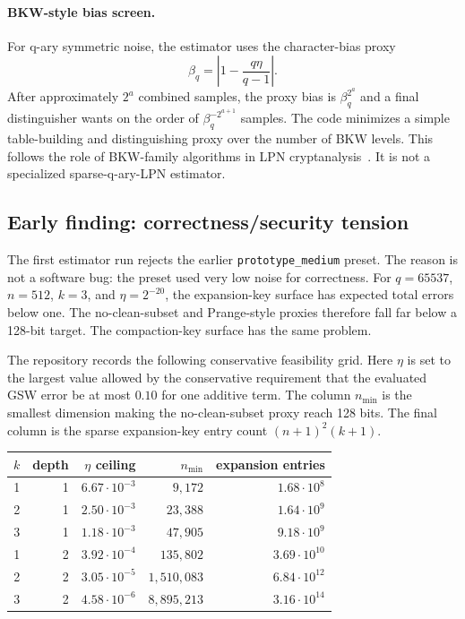 \paragraph{BKW-style bias screen.}
For q-ary symmetric noise, the estimator uses the character-bias proxy
\[
  \beta_q = \left|1-\frac{q\eta}{q-1}\right|.
\]
After approximately $2^a$ combined samples, the proxy bias is $\beta_q^{2^a}$ and a final distinguisher wants on the order of $\beta_q^{-2^{a+1}}$ samples.  The code minimizes a simple table-building and distinguishing proxy over the number of BKW levels.  This follows the role of BKW-family algorithms in LPN cryptanalysis~\cite{BlumKalaiWasserman2003,LevieilFouque2006,BogosEtAl2015}.  It is not a specialized sparse-q-ary-LPN estimator.

\subsection{Early finding: correctness/security tension}

The first estimator run rejects the earlier \texttt{prototype\_medium} preset.  The reason is not a software bug: the preset used very low noise for correctness.  For $q=65537$, $n=512$, $k=3$, and $\eta=2^{-20}$, the expansion-key surface has expected total errors below one.  The no-clean-subset and Prange-style proxies therefore fall far below a 128-bit target.  The compaction-key surface has the same problem.

The repository records the following conservative feasibility grid.  Here $\eta$ is set to the largest value allowed by the conservative requirement that the evaluated GSW error be at most $0.10$ for one additive term.  The column $n_{\min}$ is the smallest dimension making the no-clean-subset proxy reach 128 bits.  The final column is the sparse expansion-key entry count $(n+1)^2(k+1)$.

\begin{center}
\begin{tabular}{rrrrr}
\toprule
$k$ & depth & $\eta$ ceiling & $n_{\min}$ & expansion entries \\
\midrule
1 & 1 & $6.67\cdot 10^{-3}$ & $9{,}172$ & $1.68\cdot 10^8$ \\
2 & 1 & $2.50\cdot 10^{-3}$ & $23{,}388$ & $1.64\cdot 10^9$ \\
3 & 1 & $1.18\cdot 10^{-3}$ & $47{,}905$ & $9.18\cdot 10^9$ \\
1 & 2 & $3.92\cdot 10^{-4}$ & $135{,}802$ & $3.69\cdot 10^{10}$ \\
2 & 2 & $3.05\cdot 10^{-5}$ & $1{,}510{,}083$ & $6.84\cdot 10^{12}$ \\
3 & 2 & $4.58\cdot 10^{-6}$ & $8{,}895{,}213$ & $3.16\cdot 10^{14}$ \\
\bottomrule
\end{tabular}
\end{center}

